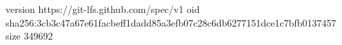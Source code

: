 version https://git-lfs.github.com/spec/v1
oid sha256:3cb3c47a67e61facbeff1dadd85a3efb07c28c6db6277151dce1c7bfb0137457
size 349692

